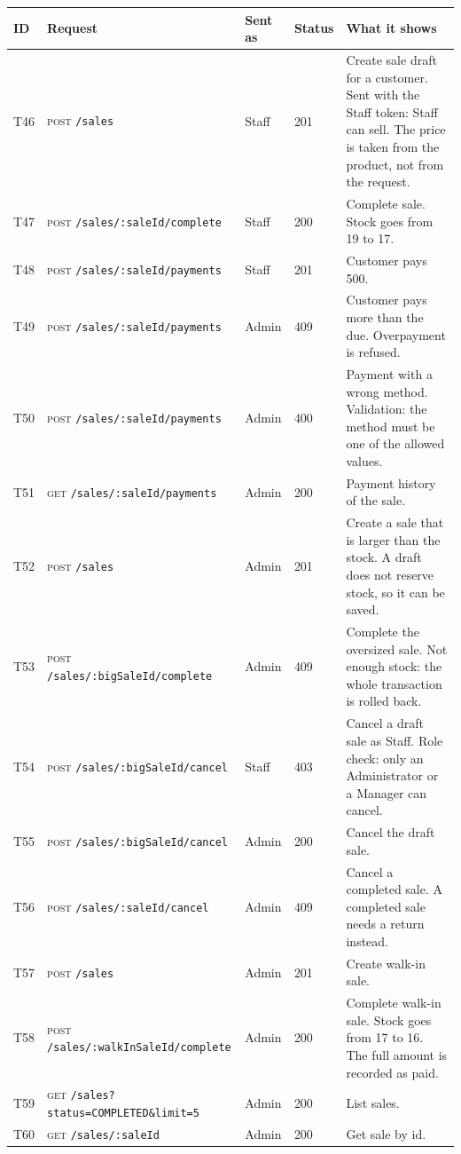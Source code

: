 \documentclass[11pt,a4paper]{article}
\newcommand{\code}[1]{\texttt{#1}}
\begin{document}
\begin{longtable}{@{}P{0.7cm}P{5.0cm}P{1.3cm}P{1.15cm}P{5.75cm}@{}}
\toprule
\textbf{ID} & \textbf{Request} & \textbf{Sent as} & \textbf{Status} & \textbf{What it shows} \\
\midrule
\endhead
T46 & \textsc{post} \code{/\allowbreak{}sales} & Staff & 201 & Create sale draft for a customer. Sent with the Staff token: Staff can sell. The price is taken from the product, not from the request. \\
T47 & \textsc{post} \code{/\allowbreak{}sales/\allowbreak{}:saleId/\allowbreak{}complete} & Staff & 200 & Complete sale. Stock goes from 19 to 17. \\
T48 & \textsc{post} \code{/\allowbreak{}sales/\allowbreak{}:saleId/\allowbreak{}payments} & Staff & 201 & Customer pays 500. \\
T49 & \textsc{post} \code{/\allowbreak{}sales/\allowbreak{}:saleId/\allowbreak{}payments} & Admin & 409 & Customer pays more than the due. Overpayment is refused. \\
T50 & \textsc{post} \code{/\allowbreak{}sales/\allowbreak{}:saleId/\allowbreak{}payments} & Admin & 400 & Payment with a wrong method. Validation: the method must be one of the allowed values. \\
T51 & \textsc{get} \code{/\allowbreak{}sales/\allowbreak{}:saleId/\allowbreak{}payments} & Admin & 200 & Payment history of the sale. \\
T52 & \textsc{post} \code{/\allowbreak{}sales} & Admin & 201 & Create a sale that is larger than the stock. A draft does not reserve stock, so it can be saved. \\
T53 & \textsc{post} \code{/\allowbreak{}sales/\allowbreak{}:bigSaleId/\allowbreak{}complete} & Admin & 409 & Complete the oversized sale. Not enough stock: the whole transaction is rolled back. \\
T54 & \textsc{post} \code{/\allowbreak{}sales/\allowbreak{}:bigSaleId/\allowbreak{}cancel} & Staff & 403 & Cancel a draft sale as Staff. Role check: only an Administrator or a Manager can cancel. \\
T55 & \textsc{post} \code{/\allowbreak{}sales/\allowbreak{}:bigSaleId/\allowbreak{}cancel} & Admin & 200 & Cancel the draft sale. \\
T56 & \textsc{post} \code{/\allowbreak{}sales/\allowbreak{}:saleId/\allowbreak{}cancel} & Admin & 409 & Cancel a completed sale. A completed sale needs a return instead. \\
T57 & \textsc{post} \code{/\allowbreak{}sales} & Admin & 201 & Create walk-in sale. \\
T58 & \textsc{post} \code{/\allowbreak{}sales/\allowbreak{}:walkInSaleId/\allowbreak{}complete} & Admin & 200 & Complete walk-in sale. Stock goes from 17 to 16. The full amount is recorded as paid. \\
T59 & \textsc{get} \code{/\allowbreak{}sales?\allowbreak{}status=\allowbreak{}COMPLETED\&\allowbreak{}limit=\allowbreak{}5} & Admin & 200 & List sales. \\
T60 & \textsc{get} \code{/\allowbreak{}sales/\allowbreak{}:saleId} & Admin & 200 & Get sale by id. \\
\bottomrule
\end{longtable}
\end{document}
